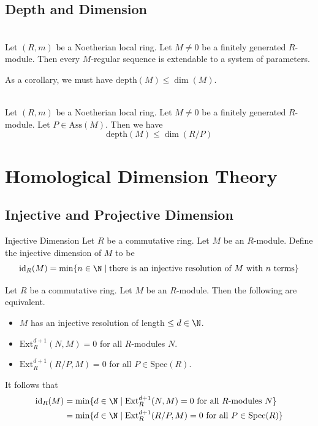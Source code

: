 \documentclass[a4paper]{article}
\begin{document}
\subsection{Depth and Dimension}
\begin{prp}{}{}\\
Let $(R,m)$ be a Noetherian local ring. Let $M\neq 0$ be a finitely generated $R$-module. Then every $M$-regular sequence is extendable to a system of parameters. 
\end{prp}

As a corollary, we must have $\text{depth}(M)\leq\dim(M)$. 

\begin{prp}{}{}\\
Let $(R,m)$ be a Noetherian local ring. Let $M\neq 0$ be a finitely generated $R$-module. Let $P\in\text{Ass}(M)$. Then we have $$\text{depth}(M)\leq\dim(R/P)$$
\end{prp}

\pagebreak
\section{Homological Dimension Theory}
\subsection{Injective and Projective Dimension}
\begin{defn}{Injective Dimension}{} Let $R$ be a commutative ring. Let $M$ be an $R$-module. Define the injective dimension of $M$ to be $$\text{id}_R(M)=\min\{n\in\N\;|\;\text{there is an injective resolution of }M\text{ with }n\text{ terms}\}$$
\end{defn}

\begin{prp}{}{} Let $R$ be a commutative ring. Let $M$ be an $R$-module. Then the following are equivalent. 
\begin{itemize}
\item $M$ has an injective resolution of length $\leq d\in\N$. 
\item $\text{Ext}_R^{d+1}(N,M)=0$ for all $R$-modules $N$. 
\item $\text{Ext}_R^{d+1}(R/P,M)=0$ for all $P\in\text{Spec}(R)$. 
\end{itemize}
\end{prp}

It follows that 
\begin{align*}
\text{id}_R(M)&=\min\{d\in\N\;|\;\text{Ext}_R^{d+1}(N,M)=0\text{ for all }R\text{-modules }N\}\\
&=\min\{d\in\N\;|\;\text{Ext}_R^{d+1}(R/P,M)=0\text{ for all }P\in\text{Spec}(R)\}
\end{align*}
\end{document}
